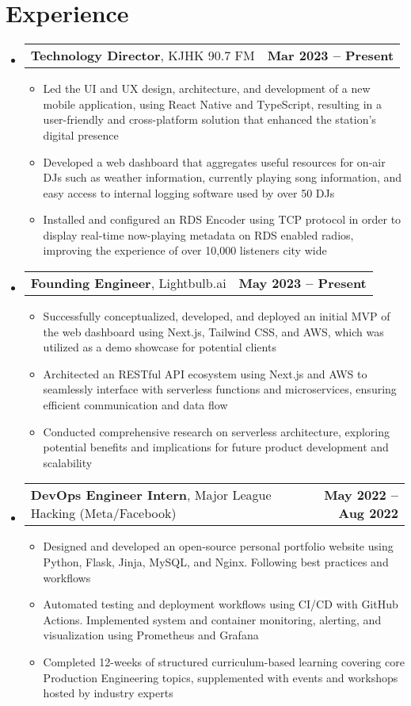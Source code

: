 \documentclass[letter,11pt]{article}
\makeatletter
\newcommand{\resumeItem}[1]{
	\item \small{{#1 \vspace{-2pt}}}
}
\newcommand{\resumeSubheading}[3]{
	\vspace{-2pt}\item
	\begin{tabular*}{1.0\textwidth}[t]{l@{\extracolsep{\fill}}r}
		\textbf{#1}, {\small #2} & \textbf{\small #3} \\
	\end{tabular*}\vspace{-7pt}
}
\newcommand{\resumeSubHeadingListStart}{\begin{itemize}[leftmargin=0.0in, label={}]}
\newcommand{\resumeSubHeadingListEnd}{\end{itemize}}
\newcommand{\resumeItemListStart}{\begin{itemize}[leftmargin=0.5cm]}
\newcommand{\resumeItemListEnd}{\end{itemize}\vspace{-5pt}}
\makeatother
\begin{document}
\section{Experience}
	\resumeSubHeadingListStart
		\resumeSubheading{Technology Director}{KJHK 90.7 FM}{Mar 2023 -- Present}
			\resumeItemListStart
				\resumeItem{Led the UI and UX design, architecture, and development of a new mobile application, using React Native and TypeScript, resulting in a user-friendly and cross-platform solution that enhanced the station's digital presence}
				\resumeItem{Developed a web dashboard that aggregates useful resources for on-air DJs such as weather information, currently playing song information, and easy access to internal logging software used by over 50 DJs}
				\resumeItem{Installed and configured an RDS Encoder using TCP protocol in order to display real-time now-playing metadata on RDS enabled radios, improving the experience of over 10,000 listeners city wide}
			\resumeItemListEnd
		\resumeSubheading{Founding Engineer}{Lightbulb.ai}{May 2023 -- Present}
			\resumeItemListStart
				\resumeItem{Successfully conceptualized, developed, and deployed an initial MVP of the web dashboard using Next.js, Tailwind CSS, and AWS, which was utilized as a demo showcase for potential clients}
				\resumeItem{Architected an RESTful API ecosystem using Next.js and AWS to seamlessly interface with serverless functions and microservices, ensuring efficient communication and data flow}
				\resumeItem{Conducted comprehensive research on serverless architecture, exploring potential benefits and implications for future product development and scalability}
			\resumeItemListEnd
		\resumeSubheading{DevOps Engineer Intern}{Major League Hacking (Meta/Facebook)}{May 2022 -- Aug 2022}
			\resumeItemListStart
				\resumeItem{Designed and developed an open-source personal portfolio website using Python, Flask, Jinja, MySQL, and Nginx. Following best practices and workflows}
				\resumeItem{Automated testing and deployment workflows using CI/CD with GitHub Actions. Implemented system and container monitoring, alerting, and visualization using Prometheus and Grafana}
				\resumeItem{Completed 12-weeks of structured curriculum-based learning covering core Production Engineering topics, supplemented with events and workshops hosted by industry experts}
			\resumeItemListEnd
	\resumeSubHeadingListEnd
\vspace{-15pt}

\end{document}
